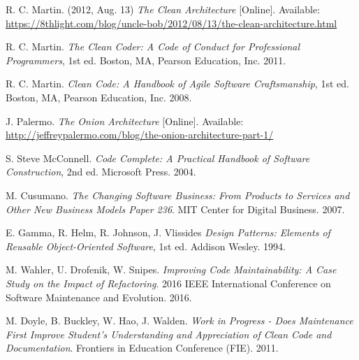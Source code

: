 \documentclass[conference]{IEEEtran}
\begin{document}
\begin{thebibliography}{1}

R. C. Martin. (2012, Aug. 13) \emph{The Clean Architecture} [Online]. Available: \url{https://8thlight.com/blog/uncle-bob/2012/08/13/the-clean-architecture.html}

R. C. Martin. \emph{The Clean Coder: A Code of Conduct for Professional Programmers}, 1st ed. Boston, MA, Pearson Education, Inc. 2011. 

R. C. Martin. \emph{Clean Code: A Handbook of Agile Software Craftsmanship}, 1st ed. Boston, MA, Pearson Education, Inc. 2008.

J. Palermo. \emph{The Onion Architecture} [Online]. Available: \url{http://jeffreypalermo.com/blog/the-onion-architecture-part-1/}

S. Steve McConnell. \emph{Code Complete: A Practical Handbook of Software Construction}, 2nd ed. Microsoft Press. 2004.

M. Cusumano. \emph{The Changing Software Business: From Products to Services and Other New Business Models Paper 236}. MIT Center for Digital Business. 2007.

E. Gamma, R. Helm, R. Johnson, J. Vlissides \emph{Design Patterns: Elements of Reusable Object-Oriented Software}, 1st ed. Addison Wesley. 1994.

M. Wahler, U. Drofenik, W. Snipes. \emph{Improving Code Maintainability: A Case Study on the Impact of Refactoring}. 2016 IEEE International Conference on Software Maintenance and Evolution. 2016.

M. Doyle, B. Buckley, W. Hao,  J. Walden. \emph{Work in Progress - Does Maintenance First Improve Student's Understanding and Appreciation of Clean Code and Documentation}. Frontiers in Education Conference (FIE). 2011.


\end{thebibliography}
\end{document}
